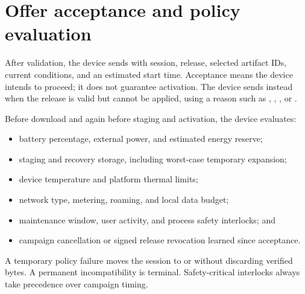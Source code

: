 \section{Offer acceptance and policy evaluation}

After validation, the device sends  with session, release, selected
artifact IDs, current conditions, and an estimated start time. Acceptance means
the device intends to proceed; it does not guarantee activation. The device sends
 instead when the release is valid but cannot be applied, using a
reason such as , ,
, or .

Before download and again before staging and activation, the device evaluates:

\begin{itemize}
  \item battery percentage, external power, and estimated energy reserve;
  \item staging and recovery storage, including worst-case temporary expansion;
  \item device temperature and platform thermal limits;
  \item network type, metering, roaming, and local data budget;
  \item maintenance window, user activity, and process safety interlocks; and
  \item campaign cancellation or signed release revocation learned since acceptance.
\end{itemize}

A temporary policy failure moves the session to  or 
without discarding verified bytes. A permanent incompatibility is terminal.
Safety-critical interlocks always take precedence over campaign timing.

